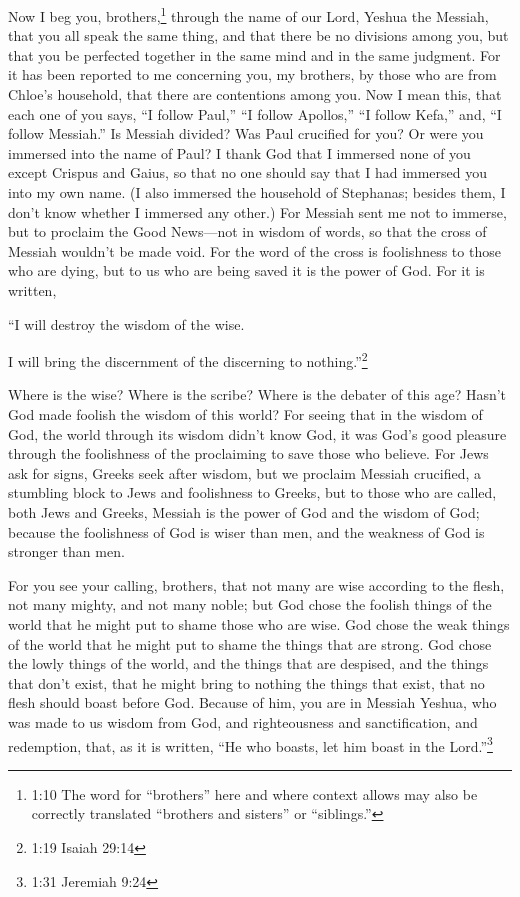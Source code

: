 \myverse{}Now I beg you, brothers,\footnote{1:10 The word for “brothers” here and where context allows may also be correctly translated “brothers
	and sisters” or “siblings.”} through the name of our Lord, Yeshua the Messiah, that you all speak
the same thing, and that there be no divisions among you, but that you be perfected together in the same
mind and in the same judgment.
\myverse{}For it has been reported to me concerning you, my brothers, by those who are
from Chloe’s household, that there are contentions among you.
\myverse{}Now I mean this, that each one of you says, “I follow Paul,” “I follow Apollos,”
“I follow Kefa,” and, “I follow Messiah.”
\myverse{}Is Messiah divided? Was Paul crucified for you? Or were you immersed into
the name of Paul?
\myverse{}I thank God that I immersed none of you except Crispus and Gaius,
\myverse{}so that no one should say that I had immersed you into my own name.
\myverse{}(I also immersed the household of Stephanas; besides them, I don’t know whether
I immersed any other.)
\myverse{}For Messiah sent me not to immerse, but to proclaim the Good News—not in wisdom
of words, so that the cross of Messiah wouldn’t be made void.
\myverse{}For the word of the cross is foolishness to those who are dying, but to us
who are being saved it is the power of God.
\myverse{}For it is written,

“I will destroy the wisdom of the wise.

I will bring the discernment of the discerning to nothing.”\footnote{1:19 Isaiah 29:14}

\myverse{}Where is the wise? Where is the scribe? Where is the debater
of this age? Hasn’t God made foolish the wisdom of this world?
\myverse{}For seeing that in the wisdom of God, the world through its wisdom didn’t
know God, it was God’s good pleasure through the foolishness of the proclaiming to save those who believe.
\myverse{}For Jews ask for signs, Greeks seek after wisdom,
\myverse{}but we proclaim Messiah crucified, a stumbling block to Jews and foolishness
to Greeks,
\myverse{}but to those who are called, both Jews and Greeks, Messiah is the power of
God and the wisdom of God;
\myverse{}because the foolishness of God is wiser than men, and the weakness of God
is stronger than men.

\myverse{}For you see your calling, brothers, that not many are wise according
to the flesh, not many mighty, and not many noble;
\myverse{}but God chose the foolish things of the world that he might put to shame those
who are wise. God chose the weak things of the world that he might put to shame the things that are strong.
\myverse{}God chose the lowly things of the world, and the things that are despised,
and the things that don’t exist, that he might bring to nothing the things that exist,
\myverse{}that no flesh should boast before God.
\myverse{}Because of him, you are in Messiah Yeshua, who was made to us wisdom from
God, and righteousness and sanctification, and redemption,
\myverse{}that, as it is written, “He who boasts, let him boast in the Lord.”\footnote{1:31 Jeremiah 9:24}


